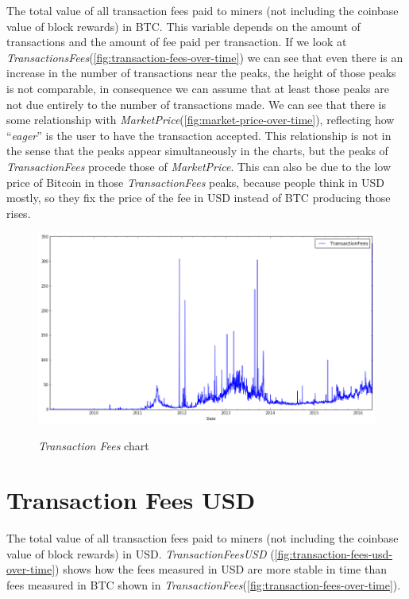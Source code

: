 The total value of all transaction fees paid to miners (not including
the coinbase value of block rewards) in BTC. This variable depends on
the amount of transactions and the amount of fee paid per transaction.
If we look at
\textit{TransactionsFees}(\autoref{fig:transaction-fees-over-time}) we
can see that even there is an increase in the number of transactions
near the peaks, the height of those peaks is not comparable, in
consequence we can assume that at least those peaks are not due
entirely to the number of transactions made. We can see that there is
some relationship with
\textit{MarketPrice}(\autoref{fig:market-price-over-time}), reflecting
how ``\textit{eager}'' is the user to have the transaction accepted.
This relationship is not in the sense that the peaks appear
simultaneously in the charts, but the peaks of
\textit{TransactionFees} procede those of \textit{MarketPrice}. This
can also be due to the low price of Bitcoin in those
\textit{TransactionFees} peaks, because people think in USD mostly, so
they fix the price of the fee in USD instead of BTC producing those
rises.

\begin{figure}[bth]
  \myfloatalign
  {\includegraphics[width=1\linewidth]
    {gfx/transaction-fees-over-time}}
  \caption{\textit{Transaction Fees} chart}
  \label{fig:transaction-fees-over-time}
\end{figure}


\section{Transaction Fees USD}
\label{sec:transaction-fees-usd}

The total value of all transaction fees paid to miners (not including
the coinbase value of block rewards) in USD.
\textit{TransactionFeesUSD}
(\autoref{fig:transaction-fees-usd-over-time}) shows how the fees
measured in USD are more stable in time than fees measured in BTC
shown in
\textit{TransactionFees}(\autoref{fig:transaction-fees-over-time}).

